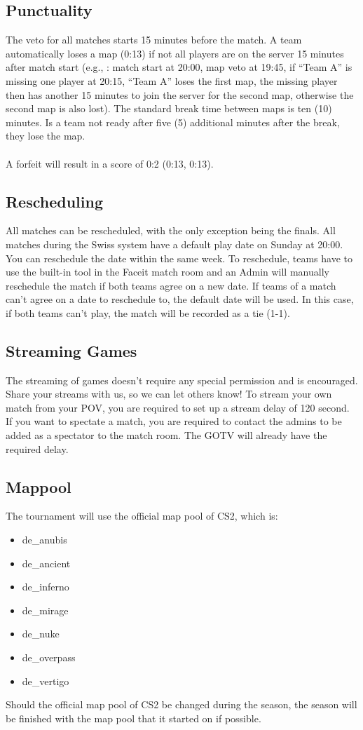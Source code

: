 \documentclass{article}
\begin{document}
\subsection{Punctuality}
The veto for all matches starts 15 minutes before the match. A team automatically loses a map (0:13) if not all players are on the server 15 minutes after match start (e.g., : match start at 20:00, map veto at 19:45, if “Team A” is missing one player at 20:15, “Team A” loses the first map, the missing player then has another 15 minutes to join the server for the second map, otherwise the second map is also lost). The standard break time between maps is ten (10) minutes. Is a team not ready after five (5) additional minutes after the break, they lose the map. \\
\\
A forfeit will result in a score of 0:2 (0:13, 0:13).

\subsection{Rescheduling}
All matches can be rescheduled, with the only exception being the finals. All matches during the Swiss system have a default play date on Sunday at 20:00. You can reschedule the date within the same week. To reschedule, teams have to use the built-in tool in the Faceit match room and an Admin will manually reschedule the match if both teams agree on a new date. If teams of a match can't agree on a date to reschedule to, the default date will be used. In this case, if both teams can't play, the match will be recorded as a tie (1-1).

\subsection{Streaming Games}
The streaming of games doesn't require any special permission and is encouraged. Share your streams with us, so we can let others know! To stream your own match from your POV, you are required to set up a stream delay of 120 second. If you want to spectate a match, you are required to contact the admins to be added as a spectator to the match room. The GOTV will already have the required delay.

\subsection{Mappool}
The tournament will use the official map pool of CS2, which is:
\begin{itemize}
    \item de\_anubis
    \item de\_ancient
    \item de\_inferno
    \item de\_mirage
    \item de\_nuke
    \item de\_overpass
    \item de\_vertigo 
\end{itemize}
Should the official map pool of CS2 be changed during the season, the season will be finished with the map pool that it started on if possible.
\end{document}

